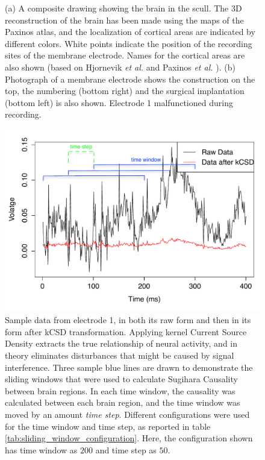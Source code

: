 \documentclass[journal,12pt,onecolumn,draftclsnofoot]{IEEEtran}  %
\begin{document}
\begin{figure}[H]
\begin{subfigure}[b]{0.45\textwidth}
    \caption{}
  \end{subfigure}
  \caption{(a) A composite drawing showing the brain in the scull. The 3D reconstruction of the brain has been made using the maps of the Paxinos atlas, and the localization of cortical areas are indicated by different colors. White points indicate the position of the recording sites of the membrane electrode. Names for the cortical areas are also shown (based on Hjornevik \textit{et al.} and Paxinos \textit{et al.} \cite{hjornevik2007} \cite{paxinos2009}). (b) Photograph of a membrane electrode shows the construction on the top, the numbering (bottom right) and the surgical implantation (bottom left) is also shown. Electrode 1 malfunctioned during recording.}
  \label{fig:rat_experiment}
\end{figure}


\begin{figure}[H]
  \includegraphics[width=\linewidth]{figures/sample_eeg_signal_with_kcsd_edited.pdf}
  \caption{Sample data from electrode 1, in both its raw form and then in its form after kCSD transformation. Applying kernel Current Source Density extracts the true relationship of neural activity, and in theory eliminates disturbances that might be caused by signal interference. Three sample blue lines are drawn to demonstrate the sliding windows that were used to calculate Sugihara Causality between brain regions. In each time window, the causality was calculated between each brain region, and the time window was moved by an amount \textit{time step}. Different configurations were used for the time window and time step, as reported in table \ref{tab:sliding_window_configuration}. Here, the configuration shown has time window as $200$ and time step as $50$.}
  \label{fig:example_eeg_and_kcsd}
\end{figure}
\end{document}
